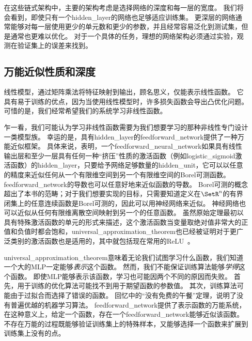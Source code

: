 在这些链式架构中，主要的架构考虑是选择网络的深度和每一层的宽度。
我们将会看到，即使只有一个\gls{hidden_layer}的网络也足够适应训练集。
更深层的网络通常能够对每一层使用更少的单元数和更少的参数，并且经常容易泛化到测试集，但是通常也更难以优化。
对于一个具体的任务，理想的网络架构必须通过实验，观测在验证集上的误差来找到。

\subsection{万能近似性质和深度}
\label{sec:universal_approximation_properties_and_depth}

线性模型，通过矩阵乘法将特征映射到输出，顾名思义，仅能表示线性函数。
它具有易于训练的优点，因为当使用线性模型时，许多损失函数会导出凸优化问题。
可惜的是，我们经常希望我们的系统学习非线性函数。

乍一看，我们可能认为学习非线性函数需要为我们想要学习的那种非线性专门设计一类模型族。
幸运的是，具有\gls{hidden_layer}的\gls{feedforward_network}提供了一种万能近似框架。
具体来说，\citep{Hornik-et-al-1989,Cybenko-1989}表明，一个\gls{feedforward_neural_network}如果具有线性输出层和至少一层具有任何一种``挤压''性质的激活函数（例如\gls{logistic_sigmoid}激活函数）的\gls{hidden_layer}，只要给予网络足够数量的\gls{hidden_unit}，它可以以任意的精度来近似任何从一个有限维空间到另一个有限维空间的Borel可测函数。
\gls{feedforward_network}的导数也可以任意好地来近似函数的导数\citep{Hornik-et-al-1990}。
Borel可测的概念超出了本书的范畴；对于我们想要实现的目标，只需要知道定义在$\SetR^n$的有界闭集上的任意连续函数是Borel可测的，因此可以用神经网络来近似。
神经网络也可以近似从任何有限维离散空间映射到另一个的任意函数。
虽然原始定理最初以具有特殊激活函数的单元的形式来描述，这个激活函数当变量取绝对值非常大的正值和负值时都会饱和，\gls{universal_approximation_theorem}也已经被证明对于更广泛类别的激活函数也是适用的，其中就包括现在常用的\gls{ReLU}~\citep{Leshno-et-al-1993}。


\gls{universal_approximation_theorem}意味着无论我们试图学习什么函数，我们知道一个大的MLP一定能够\emph{表示}这个函数。
然而，我们不能保证训练算法能够\emph{学得}这个函数。
即使MLP能够表示该函数，学习也可能因两个不同的原因而失败。
首先，用于训练的优化算法可能找不到用于期望函数的参数值。
其次，训练算法可能由于过拟合而选择了错误的函数。
回忆中的``没有免费的午餐''定理，说明了没有普遍优越的机器学习算法。
\gls{feedforward_network}提供了表示函数的万能系统，在这种意义上，给定一个函数，存在一个\gls{feedforward_network}能够近似该函数。
不存在万能的过程既能够验证训练集上的特殊样本，又能够选择一个函数来扩展到训练集上没有的点。

